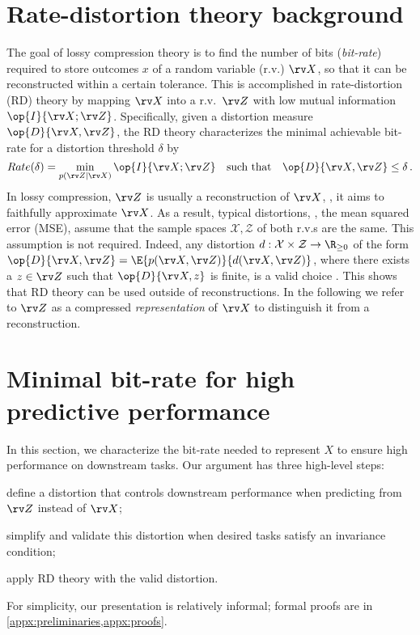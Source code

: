 \documentclass[final]{article}
\begin{document}
 
\section{Rate-distortion theory background}
\label{sec:background}

The goal of lossy compression theory is to find the number of bits (\emph{bit-rate}) required to store outcomes $x$ of a random variable (r.v.) $\rv X$, so that it can be reconstructed within a certain tolerance.
This is accomplished in  rate-distortion (RD) theory by mapping $\rv X$ into a r.v.\ $\rv Z$ with low mutual information $\op{I}{\rv X; \rv Z}$.
Specifically, given a distortion measure $\op{D}{\rv X, \rv Z}$, the RD theory characterizes the minimal achievable bit-rate for a distortion threshold $\delta$ by
\begin{equation}\label{eq:rate_distortion}
Rate(\delta) = \min_{p(\rv Z| \rv X)}   \op{I}{\rv X; \rv Z} \quad \text{such that} \quad  \op{D}{\rv X, \rv Z} \leq \delta \,.
\end{equation}
In lossy compression, $\rv Z$ is usually a reconstruction of $\rv X$, \ie,  it aims to faithfully approximate $\rv X$.
As a result, typical distortions, \eg, the mean squared error (MSE), assume that the sample spaces $\mathcal{X},\mathcal{Z}$ of both r.v.s are the same.
This assumption is not required.
Indeed, any distortion $d: \mathcal{X} \times \mathcal{Z} \to \R_{\geq 0}$ of the form $\op{D}{\rv X, \rv Z} = \E{p(\rv X, \rv Z)}{d(\rv X, \rv Z)}$, where there exists a $z \in \rv Z$ such that $\op{D}{\rv X, z}$ is finite, is a valid choice \citep{berger_rate_1968}.
This shows that RD theory can be used outside of reconstructions.
In the following we refer to $\rv Z$ as a compressed \textit{representation} of $\rv X$ to distinguish it from a reconstruction. 
\section{Minimal bit-rate for high predictive performance}
\label{sec:theory}


In this section, we characterize the bit-rate needed to represent $X$ to ensure high performance on downstream tasks.
Our argument has three high-level steps:
\begin{inlinelist}
    \item define a distortion that controls downstream performance when predicting from $\rv Z$ instead of $\rv X$;
    \item simplify and validate this distortion when desired tasks satisfy an invariance condition;
    \item apply RD theory with the valid distortion.
\end{inlinelist}
For simplicity, our presentation is relatively informal; formal proofs are in \cref{appx:preliminaries,appx:proofs}.
\end{document}

